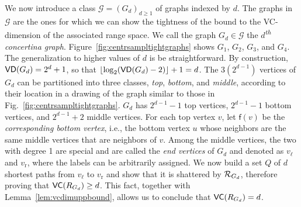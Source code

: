 We now introduce a class $\mathcal{G}=(G_d)_{d\ge 1}$ of graphs indexed by $d$.
The graphs in $\mathcal{G}$ are the ones for which we can show the tightness of
the bound to the VC-dimension of the associated range space.
We call the graph $G_d\in\mathcal{G}$ the \emph{$d$\textsuperscript{th} concertina graph}.
Figure~\ref{fig:centrsampltightgraphs} shows $G_1$, $G_2$, $G_3$, and $G_4$. The
generalization to higher values of $d$ is be straightforward.
By construction, $\mathsf{VD}(G_d)=2^d+1$, so that
$\lfloor\log_2(\mathsf{VD}(G_d)-2)\rfloor+1=d$. The $3(2^{d-1})$ vertices of $G_d$ can
be partitioned into three classes, \emph{top}, \emph{bottom}, and \emph{middle},
according to their location in a drawing of the graph similar to those in
Fig.~\ref{fig:centrsampltightgraphs}. $G_d$ has $2^{d-1}-1$ top vertices, $2^{d-1}-1$ bottom vertices, and
$2^{d-1}+2$ middle vertices. For each top vertex $v$, let $\mathsf{f}(v)$ be the
\emph{corresponding bottom vertex}, i.e., the bottom vertex $u$ whose neighbors
are the same middle vertices that are neighbors of $v$. Among the middle
vertices, the two with degree 1 are special and are called the \emph{end
vertices} of $G_d$ and denoted as $v_\ell$ and $v_\mathrm{r}$, where the
labels can be arbitrarily assigned. We now build a set $Q$ of $d$
shortest paths from $v_\ell$ to $v_\mathrm{r}$ and show that it is
shattered by $\mathcal{R}_{G_d}$, therefore proving that $\mathsf{VC}(R_{G_d})\ge d$.
This fact, together with Lemma~\ref{lem:vcdimuppbound}, allows us to conclude
that $\mathsf{VC}(R_{G_d})=d$. 

